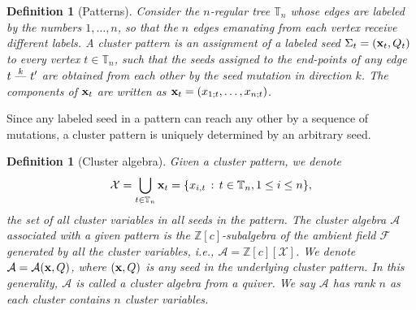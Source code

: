 \documentclass[12pt]{amsart}
\newtheorem{definition}[theorem]{Definition}
\theoremstyle{remark}
\theoremstyle{remark}
\begin{document}
\begin{definition}[Patterns]
Consider the $n$-regular tree $\mathbb{T}_n$ whose edges are labeled by the numbers $1, \ldots, n$, so that the $n$ edges emanating from each vertex receive different labels.
A \emph{cluster pattern} is an assignment of a labeled seed $\Sigma_t = (\bold x_t, Q_t)$ to every vertex $t \in \mathbb{T}_n$, such that the seeds assigned to the end-points of any edge $t \,\, \overset{k}{\mbox{\----}} \,\, t'$ are obtained from each other by the seed mutation in direction $k$.
The components of $\bold x_t$ are written as $\bold x_t = (x_{1;t}, \ldots, x_{n;t})$.
\end{definition}

Since any labeled seed in a pattern can reach any other by a sequence of mutations, a cluster pattern is uniquely determined by an arbitrary seed.

\begin{definition}[Cluster algebra]
Given a cluster pattern, we denote
$$\mathcal{X} = \bigcup_{t \in \mathbb{T}_n} \bold x_t = \{x_{i, t} \, : \, t \in \mathbb{T}_n, 1 \le i \le n\},$$
the set of all cluster variables in all seeds in the pattern.
The cluster algebra $\mathcal{A}$ associated with a given pattern is the $\mathbb{Z}[c]$-subalgebra of the ambient field $\mathcal{F}$ generated by all the cluster variables, i.e., $\mathcal{A} = \mathbb{Z}[c][\mathcal{X}]$.
We denote $\mathcal{A} = \mathcal{A}(\bold x, Q)$, where $(\bold x, Q)$ is any seed in the underlying cluster pattern.
In this generality, $\mathcal{A}$ is called a cluster algebra from a quiver.
We say $\mathcal{A}$ has \emph{rank} $n$ as each cluster contains $n$ cluster variables.
\end{definition}
\end{document}
